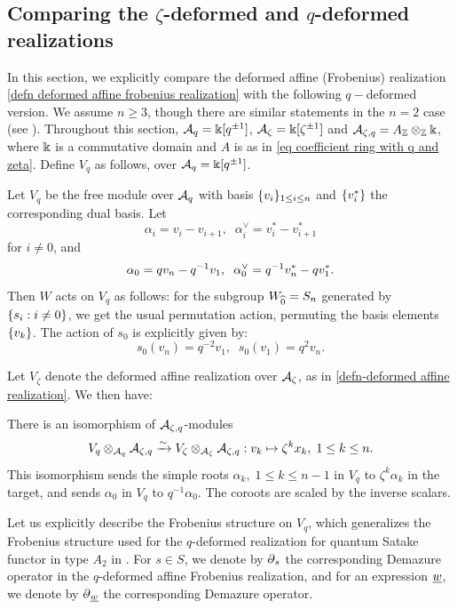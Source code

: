 \subsection{Comparing the \texorpdfstring{$\zeta$}{zeta}-deformed and \texorpdfstring{$q$}{q}-deformed realizations} \label{appendix:comparisonqz}
In this section, we explicitly compare the deformed affine (Frobenius) realization \cref{defn deformed affine frobenius realization} with the following $q-$deformed version.
We assume $n \geq 3$, though there are similar statements in the $n=2$ case (see \cite{EJY1}).
Throughout this section, $\mathcal{A}_q=\Bbbk[q^{\pm1}]$, $\mathcal{A}_\zeta=\Bbbk[\zeta^{\pm1}]$ and $\mathcal{A}_{\zeta,q}=A_{\mathbb{Z}}\otimes_{\mathbb{Z}}\Bbbk$, where $\Bbbk$ is a commutative domain and $A$ is as in \cref{eq coefficient ring with q and zeta}.
Define $V_q$ as follows, over $\mathcal{A}_q=\Bbbk[q^{\pm1}]$.
\begin{defn}\cite[Definition 2.4]{EJY1}\label{defn q-deformed affine realization}
    Let $V_q$ be the free module over $\mathcal{A}_q$ with basis $\{v_i\}_{1\leq i \leq n}$ and $\{v_i^*\}$ the corresponding dual basis.
    Let $$\alpha_i=v_i-v_{i+1},\;\; \alpha_{i}^\vee=v_i^*-v_{i+1}^*$$ for $i \neq 0$, and $$\alpha_0=qv_n-q^{-1}v_1, \;\;\alpha_0^\vee=q^{-1}v_n^*-qv_1^*.$$
    Then $W$ acts on $V_q$ as follows:
    for the subgroup $W_{\widehat{0}}=S_n$ generated by $\{s_i: i\neq 0\}$, we get the usual permutation action, permuting the basis elements $\{v_k\}$.
    The action of $s_0$ is explicitly given by:
    $$s_0(v_n)=q^{-2}v_1,\;\; s_0(v_1)=q^{2} v_n.$$
\end{defn}

Let $V_\zeta$ denote the deformed affine realization over $\mathcal{A}_\zeta$, as in \cref{defn-deformed affine realization}. 
We then have:
\begin{lemma} \cite[Lemma 2.12]{EJY1}\label{lemma q-deformed to zeta-deformed affine realization}
    There is an isomorphism of $\mathcal{A}_{\zeta,q}$-modules
    $$V_q\otimes_{\mathcal{A}_q}\mathcal{A}_{\zeta,q} \xrightarrow{\sim} V_{\zeta}\otimes_{\mathcal{A}_\zeta}\mathcal{A}_{\zeta,q}: v_k \mapsto \zeta^k x_k, \;\text{$1\leq k \leq n$}.$$
    This isomorphism sends the simple roots $\alpha_k, \; 1\leq k \leq n-1$ in $V_q$ to $\zeta^k\alpha_k$ in the target, and sends $\alpha_0$ in $V_q$ to $q^{-1}\alpha_0$.
    The coroots are scaled by the inverse scalars.
\end{lemma}

Let us explicitly describe the Frobenius structure on $V_q$, which generalizes the Frobenius structure used for the $q$-deformed realization for quantum Satake functor in type $A_2$ in \cite{EQuantumI}.
For $s \in S$, we denote by $\ddq_s$ the corresponding Demazure operator in the $q$-deformed affine Frobenius realization, and for an expression $\underline{w}$, we denote by $\ddq_{\un{w}}$ the corresponding Demazure operator.

